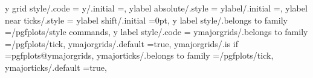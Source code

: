 {{{{{{{y grid style/.code                                                 ={%
y/.initial                                                         =,%
ylabel absolute/.style                                             ={%
ylabel/.initial                                                    =,                                                                                                                                  
ylabel near ticks/.style                                           ={%
ylabel shift/.initial                                              =0pt,                                                                                                                               
y label style/.belongs to family                                   =/pgfplots/style commands,                                                                                                          
y label style/.code                                                ={%
ymajorgrids/.belongs to family                                     =/pgfplots/tick,                                                                                                                    
ymajorgrids/.default                                               =true,                                                                                                                              
ymajorgrids/.is if                                                 =pgfplots@ymajorgrids,                                                                                                              
ymajorticks/.belongs to family                                     =/pgfplots/tick,                                                                                                                    
ymajorticks/.default                                               =true,                                                                                                                              
}}}}}}}}}}}

